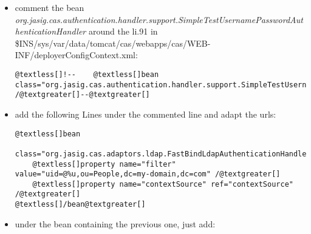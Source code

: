 \documentclass[letterpaper,10pt,english]{sphinxmanual}
\begin{document}
\begin{itemize}
\item {} 
comment the bean \emph{org.jasig.cas.authentication.handler.support.SimpleTestUsernamePasswordAuthenticationHandler} around the li.91 in \$INS/sys/var/data/tomcat/cas/webapps/cas/WEB-INF/deployerConfigContext.xml:

\begin{Verbatim}[commandchars=@\[\]]
@textless[]!--    @textless[]bean class="org.jasig.cas.authentication.handler.support.SimpleTestUsernamePasswordAuthenticationHandler" /@textgreater[]--@textgreater[]
\end{Verbatim}

\item {} 
add the following Lines under the commented line and adapt the urls:

\begin{Verbatim}[commandchars=@\[\]]
@textless[]bean
    class="org.jasig.cas.adaptors.ldap.FastBindLdapAuthenticationHandler"@textgreater[]
    @textless[]property name="filter" value="uid=@%u,ou=People,dc=my-domain,dc=com" /@textgreater[]
    @textless[]property name="contextSource" ref="contextSource" /@textgreater[]
@textless[]/bean@textgreater[]
\end{Verbatim}

\item {} 
under the bean containing the previous one, just add:


\end{itemize}
\end{document}
